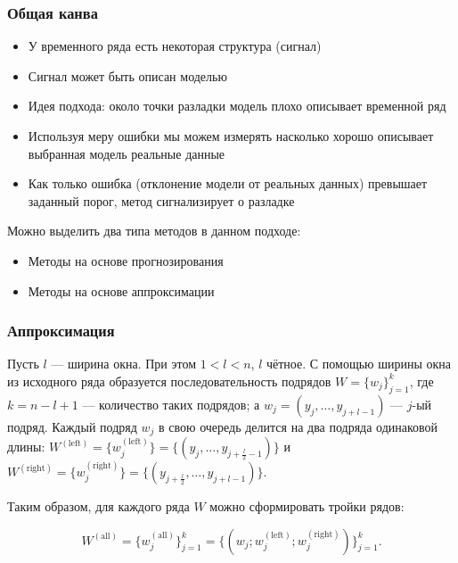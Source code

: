 \documentclass[intlimits, 9pt, unicode]{beamer}
\begin{document}
\begin{frame}
    \frametitle{Общая канва}

\begin{itemize}
	\item У временного ряда есть некоторая структура (сигнал)
	\item Сигнал может быть описан моделью
	\item Идея подхода: около точки разладки модель плохо описывает
временной ряд
	\item Используя меру ошибки мы можем измерять насколько хорошо описывает выбранная модель реальные данные
	\item Как только ошибка (отклонение
модели от реальных данных) превышает заданный порог, метод сигнализирует о разладке
\end{itemize}


Можно выделить два типа методов в данном подходе:
\begin{itemize}
	\item Методы на основе прогнозирования
	\item Методы на основе аппроксимации
\end{itemize}

\end{frame}


\begin{frame}
    \frametitle{Аппроксимация}

Пусть $l$ --- ширина окна. При этом  $ 1 < l < n $, $l$ чётное. С помощью ширины окна из исходного ряда образуется последовательность подрядов $W = \{ w_j \}_{j=1}^k$, где $k = n - l + 1$ --- количество таких подрядов; а $ w_j = (y_j, \dots, y_{j+l-1}) $ --- $j$-ый подряд. Каждый подряд  $w_j$  в свою очередь делится на два подряда одинаковой длины: $ W^{\mathrm{(left)}} = \{w_j^{\mathrm{(left)}} \}  =  \{(y_j, \dots, y_{j+\frac{l}{2}-1}) \}$ и $W^{\mathrm{(right)}} = \{w_j^{\mathrm{(right)}} \} = \{(y_{j+\frac{l}{2}}, \dots, y_{j+l-1}) \}$.

Таким образом, для каждого ряда $W$ можно сформировать тройки рядов: 

\begin{equation*}
W^{\mathrm{(all)}} = \{w_j^{\mathrm{(all)}} \}_{j=1}^k =  \{(w_j; w_j^{\mathrm{(left)}}; w_j^{\mathrm{(right)}}) \}_{j=1}^k. 
\end{equation*}

\end{frame}
\end{document}
